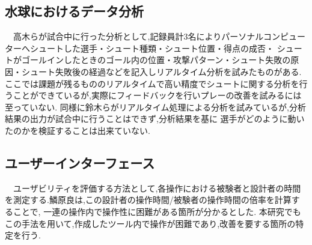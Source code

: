 \documentclass[../main.tex]{subfiles}
\begin{document}
\subsection{水球におけるデータ分析}
\par　高木らが試合中に行った分析として,記録員計3名によりパーソナルコンピューターへシュートした選手・シュート種類・シュート位置・得点の成否・
シュートがゴールインしたときのゴール内の位置・攻撃パターン・シュート失敗の原因・シュート失敗後の経過などを記入しリアルタイム分析を試みたものがある.\cite{高木英樹1989原著}
ここでは課題が残るもののリアルタイムで高い精度でシュートに関する分析を行うことができているが,実際にフィードバックを行いプレーの改善を試みるには至っていない.
同様に鈴木らがリアルタイム処理による分析を試みているが,分析結果の出力が試合中に行うことはできず,分析結果を基に
選手がどのように動いたのかを検証することは出来ていない.\cite{鈴木茂廣1995水球競技リアルタイムゲーム分析システムの開発}

\subsection{ユーザーインターフェース}
\par　ユーザビリティを評価する方法として,各操作における被験者と設計者の時間を測定する.鱗原良は,この設計者の操作時間/被験者の操作時間の倍率を計算することで,
一連の操作内で操作性に困難がある箇所が分かるとした.\cite{鱗原晴彦1999設計者と初心者ユーザーの操作時間比較によるユーザビリティ評価手法}
本研究でもこの手法を用いて,作成したツール内で操作が困難であり,改善を要する箇所の特定を行う.
\end{document}

